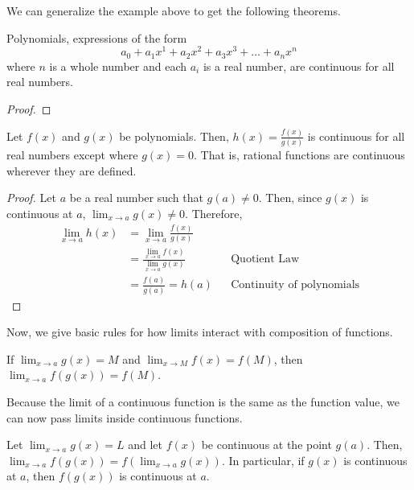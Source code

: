 \documentclass{ximera}
\begin{document}
We can generalize the example above to get the following theorems.

\begin{theorem}
  Polynomials, expressions of the form
  \[
  a_0+a_1x^1+a_2x^2+a_3x^3+\dots+a_nx^n
  \]
  where $n$ is a whole number and each $a_i$ is a real number, are
  continuous for all real numbers.
  \begin{proof}
  \end{proof}
\end{theorem}

\begin{theorem} 
Let $f(x)$ and $g(x)$ be polynomials.  Then, $h(x)=\frac{f(x)}{g(x)}$ is continuous for all real numbers except where $g(x)=0$.  That is, rational functions are continuous wherever they are defined.

\begin{proof}
      Let $a$ be a real number such that $g(a)\neq 0$.   Then, since $g(x)$ is continuous at $a$,  $\lim_{x\to a} g(x) \neq 0$.  Therefore, 
\begin{align*}
            \lim_{x \to a} h(x) &= \lim_{x\to a} \frac{f(x)}{g(x)} &&\\
             &= \frac{\lim_{x\to a} f(x)}{ \lim_{x\to a} g(x)} && \text{Quotient Law}\\
      &= \frac{f(a)}{g(a)}=h(a) && \text{Continuity of polynomials}
    \end{align*}
\end{proof}
\end{theorem}


Now, we give basic rules for how limits interact with composition
of functions.

\begin{theorem}If $\lim_{x\to a}g(x)=M$ and
  $\lim_{x\to M}f(x) = f(M)$, then $\lim_{x\to a} f(g(x)) = f(M)$.
\end{theorem}

Because the limit of a continuous function is the same as the function value, we can now pass limits inside continuous functions.  

\begin{theorem}\label{theorem:continuity}
Let $\lim_{x\to a} g(x) = L$ and let $f(x)$ be continuous at the point $g(a)$.  Then, $\lim_{x\to a} f(g(x)) = f(\lim_{x\to a} g(x))$.  In particular, if $g(x)$ is continuous at $a$, then $f(g(x))$ is continuous at $a$.
\end{theorem}
\end{document}
